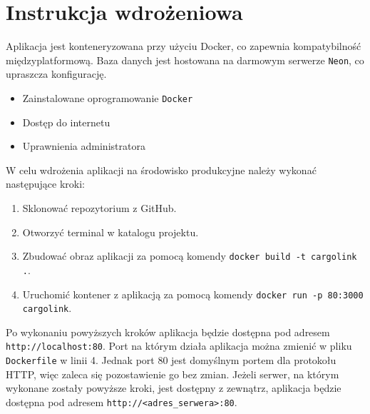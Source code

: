 \chapter{Instrukcja wdrożeniowa}
Aplikacja jest konteneryzowana przy użyciu Docker, co zapewnia kompatybilność międzyplatformową. Baza danych jest hostowana na darmowym serwerze \texttt{Neon}, co upraszcza konfigurację.
\begin{itemize}
    \item Zainstalowane oprogramowanie \texttt{Docker}
    \item Dostęp do internetu
    \item Uprawnienia administratora
\end{itemize}
W celu wdrożenia aplikacji na środowisko produkcyjne należy wykonać następujące kroki:
\begin{enumerate}
    \item Sklonować repozytorium z GitHub.
    \item Otworzyć terminal w katalogu projektu.
    \item Zbudować obraz aplikacji za pomocą komendy \texttt{docker build -t cargolink .}.
    \item Uruchomić kontener z aplikacją za pomocą komendy \texttt{docker run -p 80:3000 cargolink}.
\end{enumerate}

Po wykonaniu powyższych kroków aplikacja będzie dostępna pod adresem \texttt{http://localhost:80}. Port na którym działa aplikacja można zmienić w pliku \texttt{Dockerfile} w linii 4. Jednak port 80 jest domyślnym portem dla protokołu HTTP, więc zaleca się pozostawienie go bez zmian. Jeżeli serwer, na którym wykonane zostały powyższe kroki, jest dostępny z zewnątrz, aplikacja będzie dostępna pod adresem \texttt{http://<adres\_serwera>:80}.